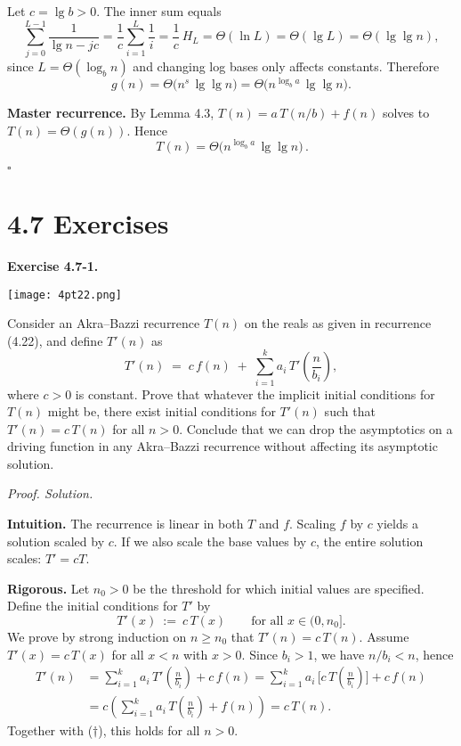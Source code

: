 \documentclass[12pt]{article}
\theoremstyle{definition}
\begin{document}
Let $c=\lg b>0$. The inner sum equals
\[
\sum_{j=0}^{L-1}\frac{1}{\lg n - j c}
=\frac{1}{c}\sum_{i=1}^{L}\frac{1}{i}
=\frac{1}{c}\,H_{L}
=\Theta(\ln L)=\Theta(\lg L)=\Theta(\lg\lg n),
\]
since $L=\Theta(\log_b n)$ and changing log bases only affects constants.
Therefore
\[
g(n)=\Theta\!\big(n^{s}\,\lg\lg n\big)=\Theta\!\big(n^{\log_b a}\,\lg\lg n\big).
\]

\textbf{Master recurrence.}
By Lemma 4.3, $T(n)=a\,T(n/b)+f(n)$ solves to $T(n)=\Theta(g(n))$. Hence
\[
\boxed{\,T(n)=\Theta\!\big(n^{\log_b a}\,\lg\lg n\big)\,}.
\]

\hfill$\square$

\newpage

\dotfill
\section*{4.7 Exercises}
\dotfill

\newpage


\medskip
\noindent\textbf{Exercise 4.7-1.}

\dotfill

\begin{center}
    \texttt{[image: 4pt22.png]}
\end{center}

\dotfill

Consider an Akra–Bazzi recurrence $T(n)$ on the reals as given in recurrence (4.22), and define $T'(n)$ as
\[
T'(n) \;=\; c\,f(n)\;+\;\sum_{i=1}^{k} a_i\,T'\!\left(\frac{n}{b_i}\right),
\]
where $c>0$ is constant. Prove that whatever the implicit initial conditions for $T(n)$ might be, there exist initial conditions for $T'(n)$ such that $T'(n)=c\,T(n)$ for all $n>0$. Conclude that we can drop the asymptotics on a driving function in any Akra–Bazzi recurrence without affecting its asymptotic solution.

\medskip
\noindent\textit{Proof. Solution.}

\noindent\textbf{Intuition.}
The recurrence is linear in both $T$ and $f$. Scaling $f$ by $c$ yields a solution scaled by $c$.
If we also scale the base values by $c$, the entire solution scales: $T'=cT$.

\medskip
\noindent\textbf{Rigorous.}
Let $n_0>0$ be the threshold for which initial values are specified.
Define the initial conditions for $T'$ by
\[
T'(x)\ :=\ c\,T(x)\qquad\text{for all }x\in(0,n_0].
\tag{$\dagger$}
\]
We prove by strong induction on $n\ge n_0$ that $T'(n)=c\,T(n)$.
Assume $T'(x)=c\,T(x)$ for all $x<n$ with $x>0$. Since $b_i>1$, we have $n/b_i<n$, hence
\[
\begin{aligned}
T'(n)
&= \sum_{i=1}^{k} a_i\,T'\!\left(\frac{n}{b_i}\right) + c\,f(n)
 = \sum_{i=1}^{k} a_i\,\Big[c\,T\!\left(\frac{n}{b_i}\right)\Big] + c\,f(n) \\
&= c\!\left(\sum_{i=1}^{k} a_i\,T\!\left(\frac{n}{b_i}\right) + f(n)\right)
 = c\,T(n).
\end{aligned}
\]
Together with ($\dagger$), this holds for all $n>0$.
\end{document}
